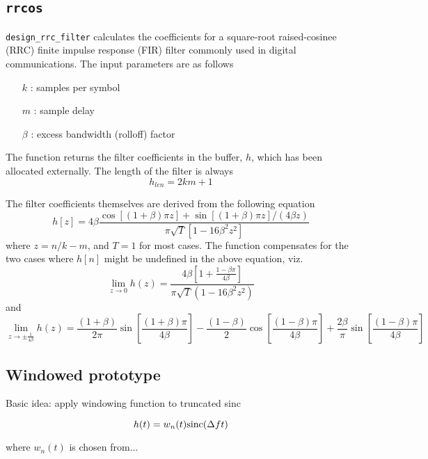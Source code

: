 \subsection{{\tt rrcos}}
{\tt design\_rrc\_filter} calculates the coefficients for a square-root
raised-cosinee (RRC) finite impulse response (FIR) filter commonly used in
digital communications.
The input parameters are as follows
\begin{itemize}
    \item[$k$] : samples per symbol
    \item[$m$] : sample delay
    \item[$\beta$] : excess bandwidth (rolloff) factor
\end{itemize}
The function returns the filter coefficients in the buffer, $h$, which has been
allocated externally.  The length of the filter is always
\[
    h_{len} = 2 k m + 1
\]

The filter coefficients themselves are derived from the following equation
\[ 
    h\left[z\right] =
      4\beta \frac{ \cos\left[(1+\beta)\pi z\right] +
                    \sin\left[(1+\beta)\pi z\right] / (4\beta z) }
                  { \pi \sqrt{T}\left[ 1-16\beta^2z^2\right] }
\]
where $z=n/k-m$, and $T=1$ for most cases.
The function compensates for the two cases where $h[n]$ might be
undefined in the above equation, viz.
\[
    \mathop {\lim }\limits_{z \to 0 } h(z) =
      \frac{ 4\beta \left[ 1 + \frac{1-\beta\pi }{ 4\beta } \right] }
           { \pi\sqrt{T}\left( 1-16\beta^2 z^2 \right) }
\]
and
\[
    \mathop {\lim }\limits_{z \to \pm \frac{1}{4\beta} } h(z) =
        \frac{(1+\beta)}{2\pi}\sin\left[\frac{(1+\beta)\pi}{4\beta}\right]
      - \frac{(1-\beta)}{2}\cos\left[\frac{(1-\beta)\pi}{4\beta}\right]
      + \frac{2\beta}{\pi}\sin\left[\frac{(1-\beta)\pi}{4\beta}\right]
\]

\subsection{Windowed prototype}
\label{ch:filterdesign:window}

Basic idea: apply windowing function to truncated sinc

\begin{equation}
h(t) = w_n(t) \textup{sinc}(\Delta f t)
\end{equation}

where $w_n(t)$ is chosen from...

